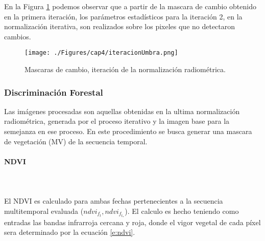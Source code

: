 En la Figura \ref{fig:iteracionRadiometrica} podemos observar que a partir de la mascara de cambio obtenido en la primera iteraci\'on, los par\'ametros estad\'isticos para la iteraci\'on 2, en la normalizaci\'on iterativa, son realizados sobre los pixeles que no detectaron cambios. 
\begin{figure}[H]
	\centering
	\texttt{[image: ./Figures/cap4/iteracionUmbra.png]}
	\caption{Mascaras de cambio, iteraci\'on de la normalizaci\'on radiom\'etrica.}
	\label{fig:iteracionRadiometrica}
\end{figure}


\subsubsection{Discriminaci\'on Forestal}\label{sec:discrForestalMet}
Las im\'agenes procesadas son aquellas obtenidas en la ultima normalizaci\'on radiom\'etrica, generada por el proceso iterativo y la imagen base para la semejanza en ese proceso. En este procedimiento se busca generar una mascara de vegetaci\'on (MV) de la secuencia temporal.
\paragraph{NDVI}\mbox{}\\\mbox{}\\
El NDVI es calculado para ambas fechas pertenecientes a la secuencia multitemporal evaluada ($ndvi_{f_{t}},ndvi_{f_{t_{*}}}  $). El calculo es hecho teniendo como entradas las bandas infrarroja cercana y roja, donde el vigor vegetal de cada p\'ixel sera determinado por la ecuaci\'on \ref{e:ndvi}. 
